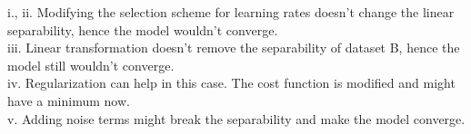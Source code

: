 \begin{answer}
i., ii. Modifying the selection scheme for learning rates doesn't change the 
linear separability, hence the model wouldn't converge. \\
iii. Linear transformation doesn't remove the separability of dataset B, hence 
the model still wouldn't converge. \\
iv. Regularization can help in this case. The cost function is modified and 
might have a minimum now. \\
v. Adding noise terms might break the separability and make the model converge. 
\\
\end{answer}
